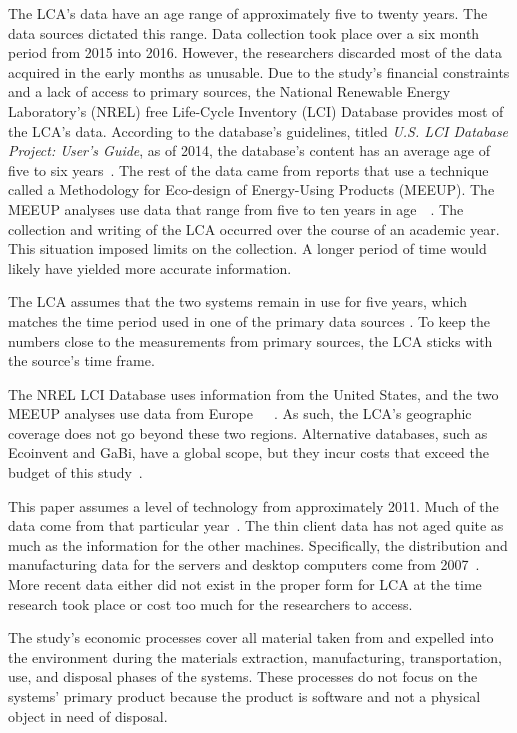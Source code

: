 \documentclass[final,journal,10pt,letterpaper,oneside,twocolumn,compsoc]%
{IEEEtran}
\begin{document}
The LCA's data have an age range of approximately five to twenty years. The
data sources dictated this range. Data
collection took place over a six month period from 2015 into 2016. However, the
researchers discarded
most of the data acquired in the early months as unusable. Due to the study's
financial constraints and a
lack of access to primary sources, the National Renewable Energy Laboratory's
(NREL) free Life-Cycle Inventory (LCI) Database provides most of the LCA's
data. According to the database's guidelines, titled \textit{U.S. LCI Database
Project: User's Guide}, as of 2014, the database's content has an average age
of five to six years~\cite{database}. The rest of the data came from reports that use a technique
called a Methodology for Eco-design of Energy-Using Products (MEEUP). The MEEUP
analyses use data that
range from five to ten years in age~\cite{client}~\cite{desktop}. The collection
and writing
of the LCA occurred over the course of an academic year. This situation
imposed limits on the collection. A longer period of time would likely have
yielded more accurate information.

The LCA assumes that the two systems remain in use for five years, which
matches the time period used in one of the primary data sources \cite{client}.
To keep the numbers close to the measurements from primary sources, the LCA
sticks with the source's time frame.

The NREL LCI Database uses information from the United States, and
the two MEEUP analyses use data from Europe~\cite{database}~\cite{client}~\cite{desktop}. As
such, the LCA's geographic coverage does not go beyond these two regions.
Alternative databases, such as Ecoinvent and GaBi, have a global scope, but they
incur costs that exceed the budget of this study~\cite{textbook}.

This paper assumes a level of technology from approximately 2011. Much of the
data come
from that particular year~\cite{client}. The thin client data has not aged quite
as much as
the information for the other machines. Specifically, the distribution and
manufacturing data for the
servers and desktop computers come from 2007~\cite{desktop}. More recent data
either did not exist in the proper form for LCA at the time research took place
or cost too much for the researchers to access.

The study's economic processes cover all material taken from and expelled into
the environment during the materials extraction, manufacturing, transportation,
use, and disposal phases of the systems. These
processes do not focus on the systems' primary product because the product is
software and not a physical object in need of disposal.
\end{document}
